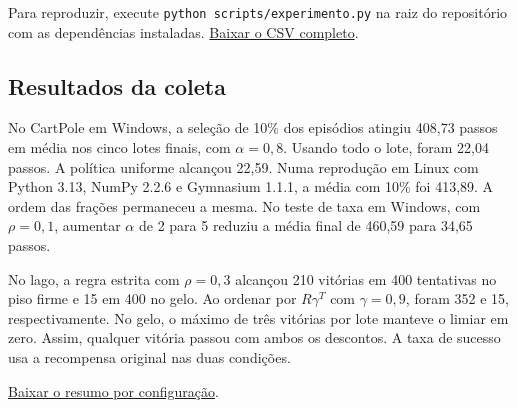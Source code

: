 Para reproduzir, execute \texttt{python scripts/experimento.py} na raiz do repositório com as dependências instaladas. \href{resultados.csv}{Baixar o CSV completo}.

\subsection*{Resultados da coleta}
No CartPole em Windows, a seleção de 10\% dos episódios atingiu 408,73 passos em média nos cinco lotes finais, com $\alpha=0{,}8$. Usando todo o lote, foram 22,04 passos. A política uniforme alcançou 22,59. Numa reprodução em Linux com Python 3.13, NumPy 2.2.6 e Gymnasium 1.1.1, a média com 10\% foi 413,89. A ordem das frações permaneceu a mesma. No teste de taxa em Windows, com $\rho=0{,}1$, aumentar $\alpha$ de 2 para 5 reduziu a média final de 460,59 para 34,65 passos.

No lago, a regra estrita com $\rho=0{,}3$ alcançou 210 vitórias em 400 tentativas no piso firme e 15 em 400 no gelo. Ao ordenar por $R\gamma^T$ com $\gamma=0{,}9$, foram 352 e 15, respectivamente. No gelo, o máximo de três vitórias por lote manteve o limiar em zero. Assim, qualquer vitória passou com ambos os descontos. A taxa de sucesso usa a recompensa original nas duas condições.

\href{resumo.csv}{Baixar o resumo por configuração}.
